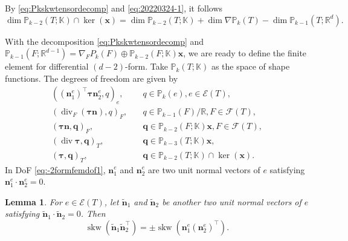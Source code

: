 \documentclass[10pt]{amsart}
\newtheorem{lemma}[theorem]{Lemma}
\renewcommand{\div}{\operatorname{div}}
\newcommand{\skw}{\operatorname{skw}}
\numberwithin{equation}{section}
\begin{document}
 By \eqref{eq:Pkskwtensordecomp} and \eqref{eq:20220324-1}, it follows
\begin{equation}\label{eq:20220324-2}
\dim\mathbb P_{k-2}(T;\mathbb K)\cap\ker(\boldsymbol{x})=\dim\mathbb P_{k-2}(T;\mathbb K)+\dim\nabla\mathbb P_k(T)- \dim\mathbb P_{k-1}(T;\mathbb R^d).
\end{equation}

With the decomposition \eqref{eq:Pkskwtensordecomp} and $\mathbb P_{k-1}(F;\mathbb R^{d-1})=\nabla_FP_k(F)\oplus\mathbb P_{k-2}(F;\mathbb K)\boldsymbol{x}$, we are ready to define the finite element for differential $(d-2)$-form. Take $\mathbb P_k(T;\mathbb K)$ as the space of shape functions. The degrees of freedom are given by
\begin{align}
((\boldsymbol{n}_1^e)^{\intercal}\boldsymbol{\tau}\boldsymbol{n}_2^e, q)_e, & \quad q\in \mathbb P_k(e), e\in\mathcal E(T), \label{eq:-2formfemdof1} \\
(\div_F(\boldsymbol{\tau}\boldsymbol{n}), q)_F, & \quad q\in \mathbb P_{k-1}(F)/\mathbb R, F\in\mathcal F(T), \label{eq:-2formfemdof21} \\
(\boldsymbol{\tau}\boldsymbol{n}, \boldsymbol{q})_F, & \quad \boldsymbol{q}\in \mathbb P_{k-2}(F;\mathbb K)\boldsymbol{x}, F\in\mathcal F(T), \label{eq:-2formfemdof22} \\
(\div\boldsymbol{\tau}, \boldsymbol{q})_T, & \quad \boldsymbol{q}\in\mathbb P_{k-3}(T;\mathbb K)\boldsymbol{x}, \label{eq:-2formfemdof31} \\
(\boldsymbol{\tau}, \boldsymbol{q})_T, & \quad \boldsymbol{q}\in \mathbb P_{k-2}(T;\mathbb K)\cap\ker(\boldsymbol{x}). \label{eq:-2formfemdof32}
\end{align}
In DoF \eqref{eq:-2formfemdof1}, $\boldsymbol{n}_1^e$ and  $\boldsymbol{n}_2^e$ are two unit normal vectors of $e$ satisfying $\boldsymbol{n}_1^e\cdot\boldsymbol{n}_2^e=0$. 
\begin{lemma}\label{lem:normalskwtensor}
For $e\in\mathcal E(T)$, let $\tilde{\boldsymbol{n}}_1$ and  $\tilde{\boldsymbol{n}}_2$ be another two unit normal vectors of $e$ satisfying $\tilde{\boldsymbol{n}}_1\cdot\tilde{\boldsymbol{n}}_2=0$. Then
\[
\skw(\tilde{\boldsymbol{n}}_1\tilde{\boldsymbol{n}}_2^{\intercal})=\pm\skw(\boldsymbol{n}_1^e(\boldsymbol{n}_2^e)^{\intercal}).
\]
\end{lemma}
\end{document}
